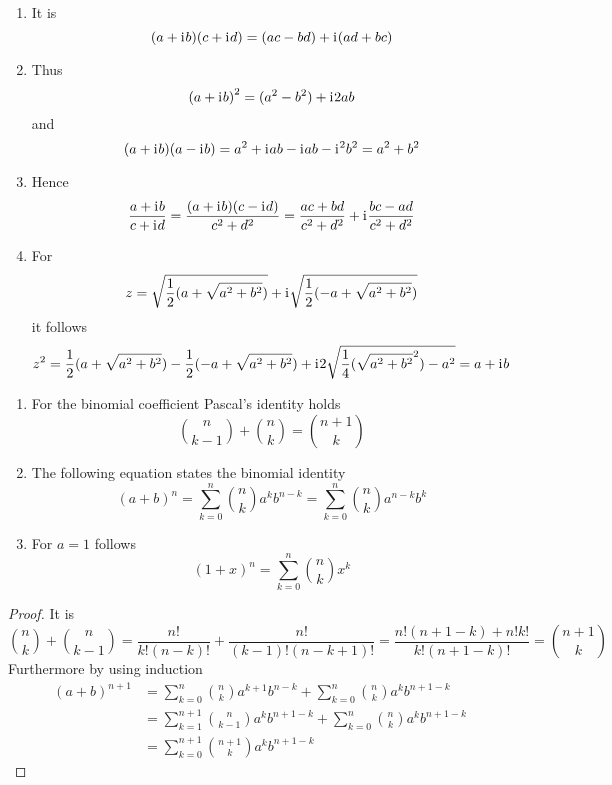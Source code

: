 \begin{lemma}\hfill
	\begin{enumerate}
		\item It is
		      \[
			      (a + \mathrm{i}\mkern1mu b) (c + \mathrm{i}\mkern1mu d) = (ac - bd) + \mathrm{i}\mkern1mu (ad + bc)
		      \]
		\item Thus
		      \[
			      {(a + \mathrm{i}\mkern1mu b)}^2 = (a^2 - b^2) + \mathrm{i}\mkern1mu 2ab
		      \]
		      and
		      \[
			      (a + \mathrm{i}\mkern1mu b) (a - \mathrm{i}\mkern1mu b) =  a^2 + \mathrm{i}\mkern1mu ab - \mathrm{i}\mkern1mu ab - \mathrm{i}\mkern1mu^2b^2 = a^2 + b^2
		      \]
		\item Hence
		      \[
			      \frac{a + \mathrm{i}\mkern1mu b}{c + \mathrm{i}\mkern1mu d} = \frac{(a + \mathrm{i}\mkern1mu b)(c - \mathrm{i}\mkern1mu d)}{c^2 + d^2} =
			      \frac{ac + bd}{c^2 + d^2} + \mathrm{i}\mkern1mu \frac{bc - ad}{c^2 + d^2}
		      \]
		\item For
		      \[
			      z = \sqrt{\frac{1}{2}(a + \sqrt{a^2 + b^2})} + \mathrm{i}\mkern1mu \sqrt{\frac{1}{2}(-a + \sqrt{a^2 + b^2})}
		      \]
		      it follows
		      \[
			      z^2 = \frac{1}{2}(a + \sqrt{a^2 + b^2}) - \frac{1}{2}(-a + \sqrt{a^2 + b^2}) +
			      \mathrm{i}\mkern1mu 2\sqrt{\frac{1}{4} (\sqrt{a^2 + b^2}^2) - a^2} = a + \mathrm{i}\mkern1mu b
		      \]
	\end{enumerate}
\end{lemma}
\bigskip


\begin{lemma}\hfill
	\begin{enumerate}
		\item For the binomial coefficient Pascal's identity holds
		      \[
			      \binom{n}{k - 1} + \binom{n}{k} = \binom{n + 1 }{k }
		      \]
		\item The following equation states the binomial identity
		      \[
			      {(a + b)}^n = \sum_{k=0}^{n} \binom{n}{k} a^{k} b^{n - k} = \sum_{k=0}^{n} \binom{n}{k} a^{n -k} b^{k}
		      \]
		\item For \( a = 1 \) follows
		      \[
			      {(1 + x)}^n = \sum_{k=0}^{n} \binom{n}{k} x^{k}
		      \]
	\end{enumerate}
\end{lemma}

\begin{proof}
	It is
	\[
		\binom{n}{k} + \binom{n}{k - 1} = \frac{n!}{k!(n - k)!} + \frac{n!}{(k - 1)!(n - k + 1)!}
		= \frac{n!(n + 1 - k) + n!k!}{k!(n + 1- k)!} = \binom{n + 1}{k}
	\]
	Furthermore by using induction
	\[
		\begin{split}
			{(a + b)}^{n + 1}	& = \sum_{k=0}^{n} \binom{n}{k} a^{k + 1} b^{n - k} +
			\sum_{k=0}^{n} \binom{n}{k} a^{k} b^{n + 1 - k} \\
			& = \sum_{k=1}^{n + 1} \binom{n}{k - 1} a^{k} b^{n + 1 - k} +
			\sum_{k=0}^{n} \binom{n}{k} a^{k} b^{n + 1 - k} \\
			& = \sum_{k=0}^{n + 1} \binom{n + 1}{k} a^{k} b^{n + 1 - k}
		\end{split}
	\]
\end{proof}
\bigskip


